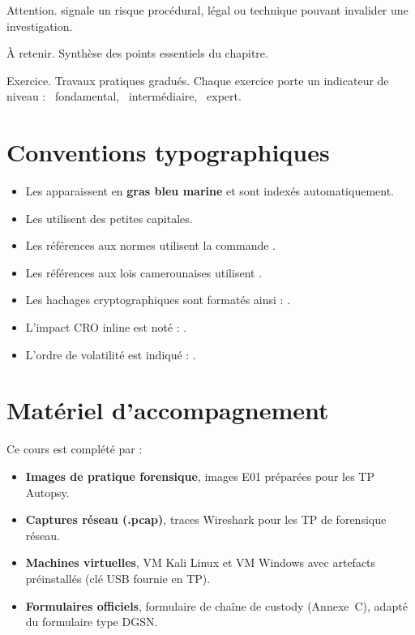 \begin{boxalert}
Attention. signale un risque procédural, légal ou technique pouvant
invalider une investigation.
\end{boxalert}

\begin{boxresume}
À retenir. Synthèse des points essentiels du chapitre.
\end{boxresume}

\begin{boxexo}
Exercice. Travaux pratiques gradués. Chaque exercice porte un indicateur
de niveau : \niveaubase\ fondamental, \niveaumoyen\ intermédiaire,
\niveauexpert\ expert.
\end{boxexo}

\section*{Conventions typographiques}

\begin{itemize}
    \item Les  apparaissent en \textbf{gras bleu marine}
          et sont indexés automatiquement.
    \item Les  utilisent des petites capitales.
    \item Les références aux normes utilisent la commande .
    \item Les références aux lois camerounaises utilisent .
    \item Les hachages cryptographiques sont formatés ainsi :
          .
    \item L'impact CRO inline est noté : .
    \item L'ordre de volatilité est indiqué : .
\end{itemize}

\section*{Matériel d'accompagnement}

Ce cours est complété par :
\begin{itemize}
    \item \textbf{Images de pratique forensique}, images E01 préparées pour
          les TP Autopsy.
    \item \textbf{Captures réseau (.pcap)}, traces Wireshark pour les TP
          de forensique réseau.
    \item \textbf{Machines virtuelles}, VM Kali Linux et VM Windows avec
          artefacts préinstallés (clé USB fournie en TP).
    \item \textbf{Formulaires officiels}, formulaire de chaîne de custody
          (Annexe~C), adapté du formulaire type DGSN.
\end{itemize}
